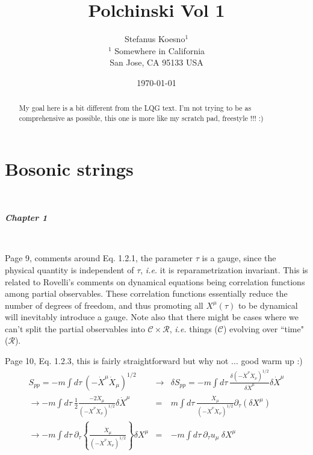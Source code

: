 \documentclass[aps,preprint,preprintnumbers,nofootinbib,showpacs,prd]{revtex4-1}
\newcommand{\ie}{{\it i.e.} }
\newcommand{\nbea}{\begin{eqnarray*}}
\newcommand{\neea}{\end{eqnarray*}}
\begin{document}
\title{Polchinski Vol 1}
\bigskip
\author{Stefanus Koesno$^1$\\
$^1$ Somewhere in California\\ San Jose, CA 95133 USA\\
}
%
\date{\today}
%
\begin{abstract}
My goal here is a bit different from the LQG text. I'm not trying to be as comprehensive as possible, this one is more like my scratch pad, freestyle !!! :)

\end{abstract}
%
\maketitle

\section{Bosonic strings}

\renewcommand{\theequation}{A.\arabic{equation}}  %
\setcounter{equation}{0}  %

{\ }

\textbf{\textit {Chapter 1}}

{\ }

Page 9, comments around Eq. 1.2.1, the parameter $\tau$ is a gauge, since the physical quantity is independent of $\tau$, \ie it is reparametrization invariant. This is related to Rovelli's comments on dynamical equations being correlation functions among partial observables. These correlation functions essentially reduce the number of degrees of freedom, and thus promoting all $X^\mu(\tau)$ to be dynamical will inevitably introduce a gauge. Note also that there might be cases where we can't split the partial observables into $\mathcal{C} \times \mathcal{R}$, \ie things ($\mathcal{C}$) evolving over ``time" ($\mathcal{R}$).

Page 10, Eq. 1.2.3, this is fairly straightforward but why not ... good warm up :)
%
\nbea
S_{pp} = -m \int d\tau~\left ( - \dot X^\mu \dot X_\mu \right ) ^{1/2} & \rightarrow & \delta S_{pp} = -m \int d\tau~ \frac {\delta \left ( - \dot X^\nu \dot X_\nu \right ) ^{1/2}} {\delta \dot X^\mu} \delta \dot X^\mu\\
\rightarrow -m \int d\tau~ \frac{1}{2}\frac {-2 \dot X_\mu } {\left ( - \dot X^\nu \dot X_\nu \right ) ^{1/2}} \delta \dot X^\mu & = & m \int d\tau~ \frac {\dot X_\mu } {\left ( - \dot X^\nu \dot X_\nu \right ) ^{1/2}} \partial_\tau (\delta X^\mu)\\
\rightarrow -m \int d\tau~ \partial_\tau \left \{ \frac {\dot X_\mu } {\left ( - \dot X^\nu \dot X_\nu \right ) ^{1/2}} \right \} \delta X^\mu & = & -m \int d\tau~ \partial_\tau u_\mu ~ \delta X^\mu
\neea
%
\end{document}
